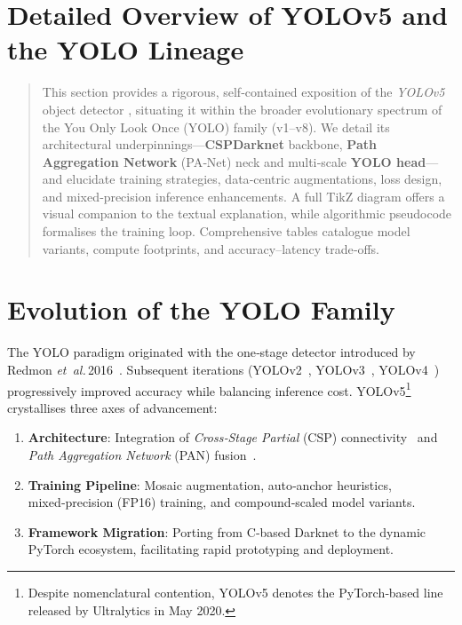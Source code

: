 \documentclass[12pt,a4paper]{article}
\begin{document}
\section*{Detailed Overview of YOLOv5 and the YOLO Lineage}

\begin{abstract}
This section provides a rigorous, self‑contained exposition of the \emph{YOLOv5} object detector \cite{khanam2024yolov5deep}, situating it within the broader evolutionary spectrum of the You Only Look Once (YOLO) family (v1–v8). We detail its architectural underpinnings—\textbf{CSPDarknet} backbone, \textbf{Path Aggregation Network} (PA‑Net) neck and multi‑scale \textbf{YOLO head}—and elucidate training strategies, data‑centric augmentations, loss design, and mixed‑precision inference enhancements. A full TikZ diagram offers a visual companion to the textual explanation, while algorithmic pseudocode formalises the training loop. Comprehensive tables catalogue model variants, compute footprints, and accuracy–latency trade‑offs.
\end{abstract}

\tableofcontents
\newpage

\section{Evolution of the YOLO Family}
\label{sec:yolo_evolution}

The YOLO paradigm originated with the one‑stage detector introduced by Redmon \emph{et al.}\,2016 \cite{redmon2016yolo}. Subsequent iterations (YOLOv2 \cite{redmon2017yolo9000}, YOLOv3 \cite{redmon2018yolov3}, YOLOv4 \cite{bochkovskiy2020yolov4}) progressively improved accuracy while balancing inference cost. YOLOv5\footnote{Despite nomenclatural contention, YOLOv5 denotes the PyTorch‑based line released by Ultralytics in May 2020.} crystallises three axes of advancement:
\begin{enumerate}[nosep]
  \item \textbf{Architecture}: Integration of \emph{Cross‑Stage Partial} (CSP) connectivity \cite{wang2020cspnet} and \emph{Path Aggregation Network} (PAN) fusion \cite{liu2018panet}.
  \item \textbf{Training Pipeline}: Mosaic augmentation, auto‑anchor heuristics, mixed‑precision (FP16) training, and compound‑scaled model variants.
  \item \textbf{Framework Migration}: Porting from C‑based Darknet to the dynamic PyTorch ecosystem, facilitating rapid prototyping and deployment.
\end{enumerate}
\end{document}
